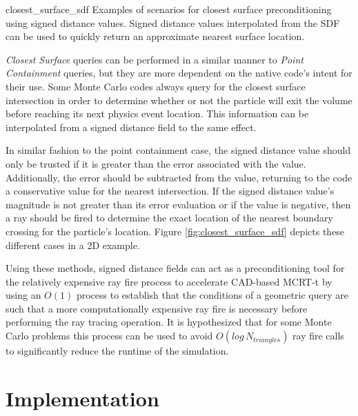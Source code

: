              {closest_surface_sdf}
             {Examples of scenarios for closest surface preconditioning using
               signed distance values. Signed distance values interpolated from
               the SDF can be used to quickly return an approximate nearest
               surface location.}
             {
               \textit{Closest Surface} queries can be performed in a similar manner to
               \textit{Point Containment} queries, but they are more dependent on the
               native code's intent for their use. Some Monte Carlo codes always
               query for the closest surface intersection in order to
               determine whether or not the particle will exit the volume before
               reaching its next physics event location. This information can be
               interpolated from a signed distance field to the same effect.
               
               In similar fashion to the point containment case, the signed
               distance value should only be trusted if it is greater than the
               error associated with the value. Additionally, the error should
               be subtracted from the value, returning to the code a
               conservative value for the nearest intersection. If the signed
               distance value's magnitude is not greater than its error
               evaluation or if the value is negative, then a ray should be
               fired to determine the exact location of the nearest boundary
               crossing for the particle's location. Figure
               \ref{fig:closest_surface_sdf} depicts these different cases in a
               2D example.
             }
             
Using these methods, signed distance fields can act as a preconditioning tool
for the relatively expensive ray fire process to accelerate CAD-based MCRT-t by
using an $O(1)$ process to establish that the conditions of a geometric query
are such that a more computationally expensive ray fire is necessary before
performing the ray tracing operation. It is hypothesized that for some Monte
Carlo problems this process can be used to avoid $O(log \, N_{triangles})$ ray
fire calls to significantly reduce the runtime of the simulation.

\section{Implementation}\label{sec:sdf_implementation}


